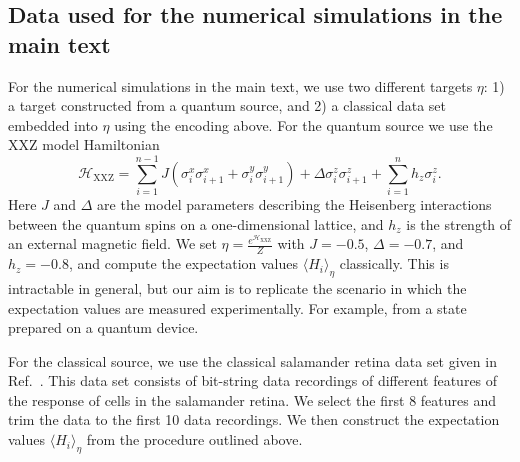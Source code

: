 \documentclass[
    aps,
    prx,
    onecolumn
]{revtex4-2}
\begin{document}
\subsection{Data used for the numerical simulations in the main text}
\label{app:numdatasets}

For the numerical simulations in the main text, we use two different targets $\eta$: 1) a target constructed from a quantum source, and 2) a classical data set embedded into $\eta$ using the encoding above. For the quantum source we use the XXZ model Hamiltonian 
\begin{equation}\label{eq:xxz}
    \mathcal{H}_{\mathrm{XXZ}} =\sum_{i=1}^{n-1}J\left(\sigma^{x}_i\sigma^{x}_{i+1}+\sigma^y_i\sigma^y_{i+1}\right)+\Delta \sigma_i^z\sigma^z_{i+1} + \sum_{i=1}^n h_z \sigma_i^z.
\end{equation} 
Here $J$ and $\Delta$ are the model parameters describing the Heisenberg interactions between the quantum spins on a one-dimensional lattice, and $h_z$ is the strength of an external magnetic field. We set $\eta=\frac{e^{\mathcal{H}_{\mathrm{XXZ}}}}{Z}$ with $J=-0.5$, $\Delta=-0.7$, and $h_z =- 0.8$, and compute the expectation values $\langle H_i\rangle_\eta$ classically. This is intractable in general, but our aim is to replicate the scenario in which the expectation values are measured experimentally. For example, from a state prepared on a quantum device. 

For the classical source, we use the classical salamander retina data set given in Ref.~\cite{Tkacik2014}. This data set consists of bit-string data recordings of different features of the response of cells in the salamander retina. We select the first $8$ features and trim the data to the first 10 data recordings. We then construct the expectation values $\langle H_i \rangle_\eta$ from the procedure outlined above.
\end{document}
